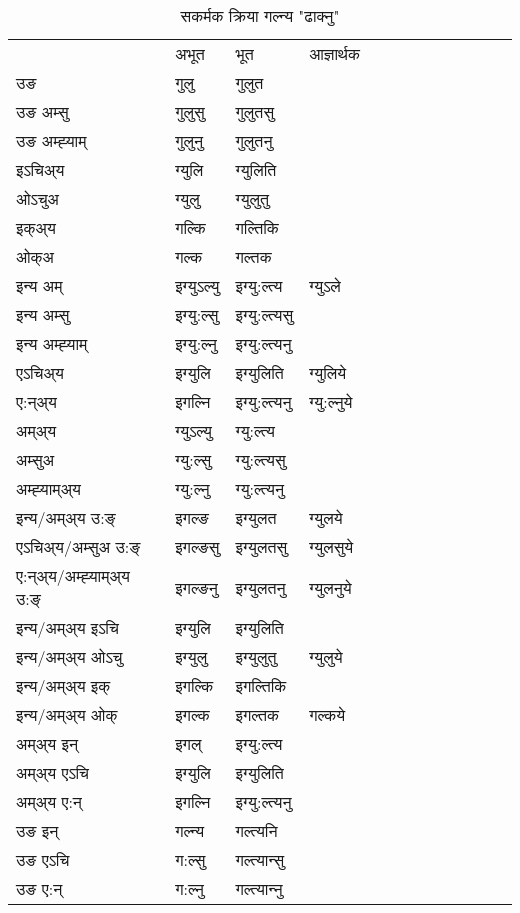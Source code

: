 \begin{table}[H]
\label{ul.vt} \centering
\caption{सकर्मक क्रिया  गल्न्य  "ढाक्नु"  }
\begin{tabular}{l|l|l|l|l|l|l|l|l|l|l|l|l}  \toprule
&अभूत & भूत & आज्ञार्थक \\ 
उङ &गुलु &गुलुत \\ 
उङ अम्सु &गुलुसु &गुलुतसु \\ 
उङ अम्ह्‍याम् &गुलुनु &गुलुतनु \\ 
इऽचिअ्य &ग्युलि &ग्युलिति   \\ 
ओऽचुअ &ग्युलु &ग्युलुतु   \\ 
इक्अ्य &गल्कि &गल्तिकि   \\ 
ओक्अ &गल्क &गल्तक   \\ 
इन्य अम् & इग्युऽल्यु  & इग्यु:ल्त्य &ग्युऽले  \\ 
इन्य अम्सु & इग्यु:ल्सु  & इग्यु:ल्त्यसु   \\ 
इन्य अम्ह्‍याम् & इग्यु:ल्नु  & इग्यु:ल्त्यनु   \\ 
एऽचिअ्य & इग्युलि & इग्युलिति &ग्युलिये    \\ 
ए:न्अ्य & इगल्नि  & इग्यु:ल्त्यनु &ग्यु:ल्नुये  \\ 
अम्अ्य & ग्युऽल्यु  & ग्यु:ल्त्य  \\ 
अम्सुअ & ग्यु:ल्सु & ग्यु:ल्त्यसु  \\ 
अम्ह्‍याम्अ्य & ग्यु:ल्नु  & ग्यु:ल्त्यनु \\ 
\midrule
इन्य/अम्अ्य उ:ङ्‌&इगल्ङ & इग्युलत &ग्युलये \\ 
एऽचिअ्य/अम्सुअ उ:ङ्‌ &इगल्ङसु & इग्युलतसु &ग्युलसुये \\ 
ए:न्अ्य/अम्ह्‍याम्अ्य उ:ङ्‌ &इगल्ङनु & इग्युलतनु &ग्युलनुये \\ 
इन्य/अम्अ्य इऽचि & इग्युलि & इग्युलिति    \\ 
इन्य/अम्अ्य ओऽचु & इग्युलु & इग्युलुतु  &ग्युलुये  \\ 
इन्य/अम्अ्य इक् & इगल्कि & इगल्तिकि   \\ 
इन्य/अम्अ्य ओक् & इगल्क & इगल्तक  &गल्कये  \\ 
अम्अ्य इन् & इगल् & इग्यु:ल्त्य   \\ 
अम्अ्य एऽचि & इग्युलि & इग्युलिति    \\ 
अम्अ्य ए:न् & इगल्नि  & इग्यु:ल्त्यनु  \\ 
\midrule
उङ इन् & गल्न्य  & गल्त्यनि  \\ 
उङ एऽचि & ग:ल्सु  & गल्त्यान्सु   \\ 
उङ ए:न्& ग:ल्नु  & गल्त्यान्‍नु   \\ 
\bottomrule
\end{tabular}
\end{table}


